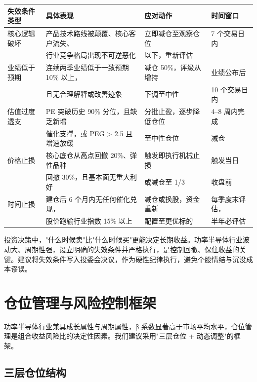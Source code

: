 \begin{exhibitbox}[表 11-8：失效条件与止损纪律]
\centering
\small
\begin{tabularx}{\textwidth}{X L{5.0cm} L{3.0cm} L{2.8cm}}
\toprule
\textbf{失效条件类型} & \textbf{具体表现} & \textbf{应对动作} & \textbf{时间窗口} \\
\midrule
核心逻辑破坏 & 产品技术路线被颠覆、核心客户流失、 & 立即减仓至观察仓位 & 7 个交易日内 \\
& 行业竞争格局出现不可逆恶化 & 以下，重新评估 & \\
\midrule
业绩低于预期 & 连续两季业绩低于一致预期 10\% 以上， & 减仓 50\%，评级从增持 & 业绩公布后 \\
& 且无合理解释或改善迹象 & 下调至中性 & 10 个交易日内 \\
\midrule
估值过度透支 & PE 突破历史 90\% 分位，且缺乏新增 & 分批止盈，逐步降低仓位 & 4–8 周内完成 \\
& 催化支撑，或 PEG > 2.5 且增速放缓 & 至中性仓位 & 减仓 \\
\midrule
价格止损 & 核心底仓从高点回撤 20\%、弹性品种 & 触发即执行机械止损 & 触发当日 \\
& 回撤 30\%，且基本面无重大利好 & 或减仓至 1/3 & 收盘前 \\
\midrule
时间止损 & 建仓后 6 个月内无任何催化兑现， & 减仓或换股，资金重新 & 每季度末评估， \\
& 股价跑输行业指数 15\% 以上 & 配置至更优标的 & 半年必评估 \\
\bottomrule
\end{tabularx}
\end{exhibitbox}

\begin{keyinsight}[失效条件比买入条件更重要]
投资决策中，"什么时候卖"比"什么时候买"更能决定长期收益。功率半导体行业波动大、周期性强，设立明确的失效条件并严格执行，是控制回撤、保住收益的关键。建议将失效条件写入投委会决议，作为硬性纪律执行，避免个股情结与沉没成本谬误。
\end{keyinsight}

\section{仓位管理与风险控制框架}

功率半导体行业兼具成长属性与周期属性，β 系数显著高于市场平均水平，仓位管理是组合收益风险比的决定性因素。我们建议采用"三层仓位 + 动态调整"的框架。

\subsection{三层仓位结构}

